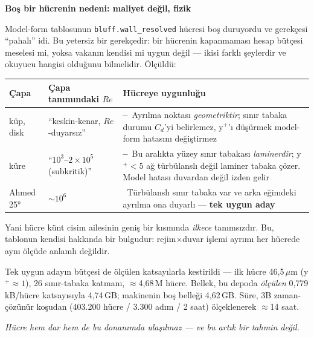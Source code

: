 \documentclass[11pt,a4paper]{article}
\newcommand{\ev}{\textcolor{iyi}{\textbf{\checkmark}}}
\newcommand{\hy}{\textcolor{kotu}{\textbf{--}}}
\newcommand{\kkkenar}{lacivert}
\newcommand{\kkzemin}{kod}
\newenvironment{renkkutu}[3]{%
  \renewcommand{\kkkenar}{#1}\renewcommand{\kkzemin}{#2}%
  \par\medskip\noindent
  \begin{lrbox}{\kutugovde}%
  \begin{minipage}{\dimexpr\linewidth-2\fboxsep-2\fboxrule\relax}\footnotesize
  \textcolor{#1}{\textbf{#3}}\par\vspace{3pt}%
}{%
  \end{minipage}%
  \end{lrbox}%
  \noindent\fcolorbox{\kkkenar}{\kkzemin}{\usebox{\kutugovde}}%
  \par\medskip
}
\newenvironment{olculdu}[1]{\begin{renkkutu}{iyi}{iyibg}{#1}}{\end{renkkutu}}
\begin{document}
\begin{olculdu}{Boş bir hücrenin nedeni: maliyet değil, fizik}
\label{sub:bluffwr}
Model-form tablosunun \texttt{bluff.wall\_resolved} hücresi boş duruyordu ve
gerekçesi ``pahalı'' idi. Bu yetersiz bir gerekçedir: bir hücrenin kapanmaması
hesap bütçesi meselesi mi, yoksa vakanın kendisi mi uygun değil --- ikisi farklı
şeylerdir ve okuyucu hangisi olduğunu bilmelidir. Ölçüldü:

\begin{center}\footnotesize
\begin{tabular}{@{}llp{7.4cm}@{}}
\toprule
\textbf{Çapa} & \textbf{Çapa tanımındaki $Re$} & \textbf{Hücreye uygunluğu} \\
\midrule
küp, disk & ``keskin-kenar, $Re$-duyarsız'' &
  \hy\ Ayrılma noktası \emph{geometriktir}; sınır tabaka durumu $C_d$'yi
  belirlemez, y$^+$'ı düşürmek model-form hatasını değiştirmez \\
küre & ``$10^3$--$2{\times}10^5$ (subkritik)'' &
  \hy\ Bu aralıkta yüzey sınır tabakası \emph{laminerdir}; y$^+{<}5$ ağ
  türbülanslı değil laminer tabaka çözer. Model hatası duvardan değil izden
  gelir \\
Ahmed 25° & $\sim$$10^6$ &
  \ev\ Türbülanslı sınır tabaka var ve arka eğimdeki ayrılma ona duyarlı ---
  \textbf{tek uygun aday} \\
\bottomrule
\end{tabular}
\end{center}

\noindent Yani hücre künt cisim ailesinin geniş bir kısmında \emph{ilkece}
tanımsızdır. Bu, tablonun kendisi hakkında bir bulgudur: rejim$\times$duvar
işlemi ayrımı her hücrede aynı ölçüde anlamlı değildir.

Tek uygun adayın bütçesi de ölçülen katsayılarla kestirildi --- ilk hücre
46{,}5\,$\mu$m (y$^+{\approx}1$), 26 sınır-tabaka katmanı,
$\approx$4{,}68\,M hücre. Bellek, bu depoda \emph{ölçülen} 0{,}779 kB/hücre
katsayısıyla 4{,}74\,GB; makinenin boş belleği 4{,}62\,GB. Süre, 3B
zaman-çözünür koşudan (403.200 hücre / 3.300 adım / 2 saat) ölçeklenerek
$\approx$14 saat.

\begin{center}\itshape
Hücre hem dar hem de bu donanımda ulaşılmaz --- ve bu artık bir tahmin değil.
\end{center}
\end{olculdu}
\end{document}
